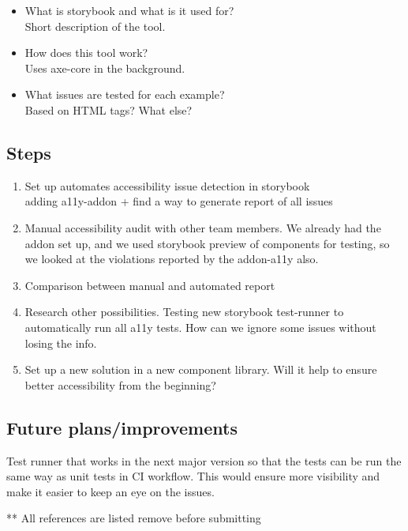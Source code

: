 \documentclass{master_thesis}
\begin{document}
\begin{itemize}
	\item What is storybook and what is it used for?\\
	Short description of the tool.
	\item How does this tool work?\\
	Uses axe-core in the background.
	\item What issues are tested for each example? \\
	Based on HTML tags? What else?
\end{itemize}

\subsection{Steps}
\begin{enumerate}
	\item Set up automates accessibility issue detection in storybook \\
	adding a11y-addon + find a way to generate report of all issues
	\item Manual accessibility audit with other team members. We already had the addon set up, and we used storybook preview of components for testing, so we looked at the violations reported by the addon-a11y also.
	\item Comparison between manual and automated report
	\item Research other possibilities. Testing new storybook test-runner to automatically run all a11y tests. How can we ignore some issues without losing the info.
	\item Set up a new solution in a new component library. Will it help to ensure better accessibility from the beginning?
\end{enumerate}

\subsection{Future plans/improvements}
Test runner that works in the next major version so that the tests can be run the same way as unit tests in CI workflow. This would ensure more visibility and make it easier to keep an eye on the issues.


\pagebreak
** All references are listed remove before submitting
\printbibliography{}
\end{document}

